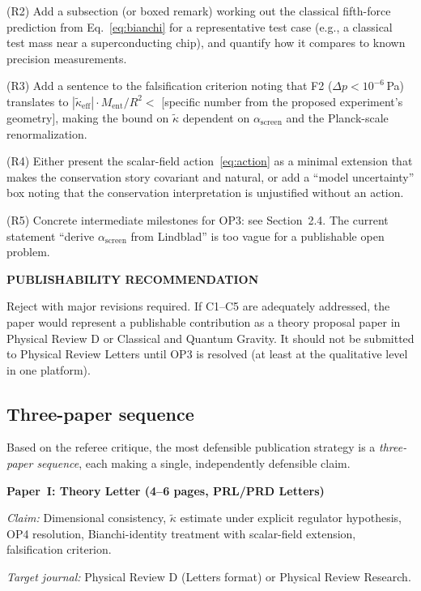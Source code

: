 \documentclass[12pt,letterpaper]{article}
\theoremstyle{plain}
\theoremstyle{definition}
\theoremstyle{remark}
\newcommand{\kt}{\tilde{\kappa}}
\newcommand{\kteff}{\tilde{\kappa}_{\mathrm{eff}}}
\newcommand{\Ment}{M_{\mathrm{ent}}}
\newcommand{\asc}{\alpha_{\mathrm{screen}}}
\begin{document}
\begin{mdframed}[backgroundcolor=boxgray,linewidth=1pt]
(R2) Add a subsection (or boxed remark) working out the classical fifth-force prediction
from Eq.~\eqref{eq:bianchi} for a representative test case (e.g., a classical test mass
near a superconducting chip), and quantify how it compares to known precision measurements.

(R3) Add a sentence to the falsification criterion noting that F2 ($\Delta p < 10^{-6}$\,Pa)
translates to $|\kteff|\cdot\Ment/R^2 < $ [specific number from the proposed experiment's
geometry], making the bound on $\kt$ dependent on $\asc$ and the Planck-scale
renormalization.

(R4) Either present the scalar-field action~\eqref{eq:action} as a minimal extension that
makes the conservation story covariant and natural, or add a ``model uncertainty'' box
noting that the conservation interpretation is unjustified without an action.

(R5) Concrete intermediate milestones for OP3: see Section~2.4.  The current statement
``derive $\asc$ from Lindblad'' is too vague for a publishable open problem.

\medskip\noindent\textbf{PUBLISHABILITY RECOMMENDATION}

Reject with major revisions required.  If C1--C5 are adequately addressed, the paper
would represent a publishable contribution as a theory proposal paper in Physical Review D
or Classical and Quantum Gravity.  It should not be submitted to Physical Review Letters
until OP3 is resolved (at least at the qualitative level in one platform).

\end{mdframed}

\subsection{Three-paper sequence}

Based on the referee critique, the most defensible publication strategy is a
\emph{three-paper sequence}, each making a single, independently defensible claim.

\medskip

\noindent\textbf{Paper~I: Theory Letter (4--6 pages, PRL/PRD Letters)}

\textit{Claim:} Dimensional consistency, $\kt$ estimate under explicit regulator hypothesis,
OP4 resolution, Bianchi-identity treatment with scalar-field extension, falsification criterion.

\textit{Target journal:} Physical Review D (Letters format) or Physical Review Research.
\end{document}
